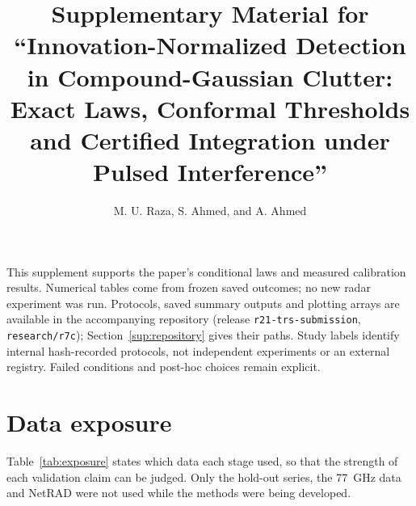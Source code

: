 \documentclass[10pt]{article}
\title{Supplementary Material for ``Innovation-Normalized Detection in Compound-Gaussian Clutter: Exact Laws, Conformal Thresholds and Certified Integration under Pulsed Interference''}
\author{M. U. Raza, S. Ahmed, and A. Ahmed}
\date{}
\begin{document}
\sloppy\maketitle
\noindent This supplement supports the paper's conditional laws and measured calibration results. Numerical tables come from frozen saved outcomes; no new radar experiment was run. Protocols, saved summary outputs and plotting arrays are available in the accompanying repository (release \texttt{r21-trs-submission}, \texttt{research/r7c}); Section~\ref{sup:repository} gives their paths. Study labels identify internal hash-recorded protocols, not independent experiments or an external registry. Failed conditions and post-hoc choices remain explicit.

\section{Data exposure}
Table~\ref{tab:exposure} states which data each stage used, so that the strength of each validation claim can be judged. Only the hold-out series, the 77~GHz data and NetRAD were not used while the methods were being developed.
\end{document}
